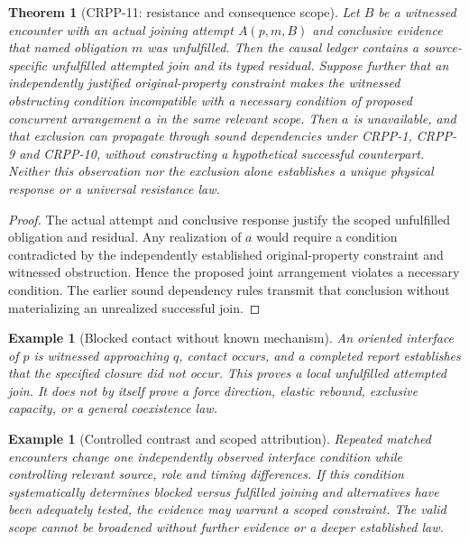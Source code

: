 \documentclass[11pt]{article}
\newtheorem{theorem}[definition]{Theorem}
\newtheorem{example}[definition]{Example}
\begin{document}
\begin{theorem}[CRPP-11: resistance and consequence scope]
Let $B$ be a witnessed encounter with an actual joining
attempt $A(p,m,B)$ and conclusive evidence that named
obligation $m$ was unfulfilled. Then the causal ledger
contains a source-specific unfulfilled attempted join
and its typed residual. Suppose further that an
independently justified original-property constraint
makes the witnessed obstructing condition incompatible
with a necessary condition of proposed concurrent
arrangement $a$ in the same relevant scope.
Then $a$ is unavailable, and that exclusion can
propagate through sound dependencies under CRPP-1,
CRPP-9 and CRPP-10, without constructing a
hypothetical successful counterpart. Neither this
observation nor the exclusion alone establishes a
unique physical response or a universal resistance law.
\end{theorem}
\begin{proof}
The actual attempt and conclusive response justify
the scoped unfulfilled obligation and residual.
Any realization of $a$ would require a condition
contradicted by the independently established
original-property constraint and witnessed obstruction.
Hence the proposed joint arrangement violates a
necessary condition. The earlier sound dependency
rules transmit that conclusion without materializing
an unrealized successful join.
\end{proof}

\begin{example}[Blocked contact without known mechanism]
An oriented interface of $p$ is witnessed approaching
$q$, contact occurs, and a completed report establishes
that the specified closure did not occur. This proves
a local unfulfilled attempted join. It does not
by itself prove a force direction, elastic rebound,
exclusive capacity, or a general coexistence law.
\end{example}

\begin{example}[Controlled contrast and scoped attribution]
Repeated matched encounters change one independently
observed interface condition while controlling relevant
source, role and timing differences. If this condition
systematically determines blocked versus fulfilled
joining and alternatives have been adequately tested,
the evidence may warrant a \emph{scoped} constraint.
The valid scope cannot be broadened without further
evidence or a deeper established law.
\end{example}
\end{document}
